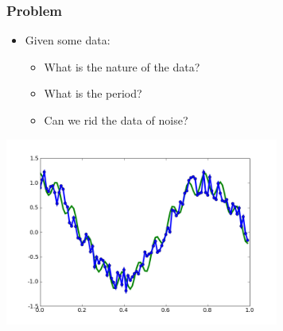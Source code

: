 \documentclass[10pt]{beamer}
\begin{document}
\begin{frame}
\frametitle{Problem}
\begin{itemize}
\item Given some data:
  \begin{itemize}
    \item What is the nature of the data?
    \item What is the period?
    \item Can we rid the data of noise?
  \end{itemize}
\end{itemize}
\begin{center}
  \includegraphics[width=9cm]{./figs/noisydata3}
\end{center}
\end{frame}
\end{document}
